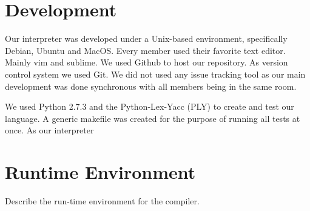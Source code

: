 \section{Development}
Our interpreter was developed under a Unix-based environment, specifically Debian, Ubuntu and MacOS.
Every member used their favorite text editor. Mainly vim and sublime. We used Github to host our
repository. As version control system we used Git. We did not used any issue tracking tool as 
our main development was done synchronous with all members being in the same room.

We used Python 2.7.3 and the Python-Lex-Yacc (PLY) to create and test our language. A generic makefile
was created for the purpose of running all tests at once. As our interpreter

\section{Runtime Environment}
Describe the run-time environment for the compiler.
